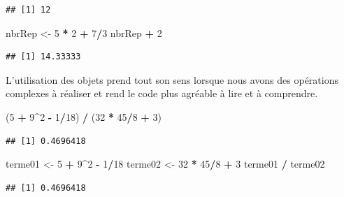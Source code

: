 \documentclass[]{book}
\newenvironment{Shaded}{\begin{snugshade}}{\end{snugshade}}
\newcommand{\DecValTok}[1]{\textcolor[rgb]{0.00,0.00,0.81}{#1}}
\newcommand{\NormalTok}[1]{#1}
\newcommand{\OperatorTok}[1]{\textcolor[rgb]{0.81,0.36,0.00}{\textbf{#1}}}
\newcommand{\StringTok}[1]{\textcolor[rgb]{0.31,0.60,0.02}{#1}}
\begin{document}
\begin{verbatim}
## [1] 12
\end{verbatim}

\begin{Shaded}
\begin{Highlighting}[]
\NormalTok{nbrRep <-}\StringTok{ }\DecValTok{5} \OperatorTok{*}\StringTok{ }\DecValTok{2} \OperatorTok{+}\StringTok{ }\DecValTok{7}\OperatorTok{/}\DecValTok{3}
\NormalTok{nbrRep }\OperatorTok{+}\StringTok{ }\DecValTok{2}
\end{Highlighting}
\end{Shaded}

\begin{verbatim}
## [1] 14.33333
\end{verbatim}

L'utilisation des objets prend tout son sens lorsque nous avons des opérations complexes à réaliser et rend le code plus agréable à lire et à comprendre.

\begin{Shaded}
\begin{Highlighting}[]
\NormalTok{(}\DecValTok{5} \OperatorTok{+}\StringTok{ }\DecValTok{9}\OperatorTok{^}\DecValTok{2} \OperatorTok{-}\StringTok{ }\DecValTok{1}\OperatorTok{/}\DecValTok{18}\NormalTok{) }\OperatorTok{/}\StringTok{ }\NormalTok{(}\DecValTok{32} \OperatorTok{*}\StringTok{ }\DecValTok{45}\OperatorTok{/}\DecValTok{8} \OperatorTok{+}\StringTok{ }\DecValTok{3}\NormalTok{)}
\end{Highlighting}
\end{Shaded}

\begin{verbatim}
## [1] 0.4696418
\end{verbatim}

\begin{Shaded}
\begin{Highlighting}[]
\NormalTok{terme01 <-}\StringTok{ }\DecValTok{5} \OperatorTok{+}\StringTok{ }\DecValTok{9}\OperatorTok{^}\DecValTok{2} \OperatorTok{-}\StringTok{ }\DecValTok{1}\OperatorTok{/}\DecValTok{18}
\NormalTok{terme02 <-}\StringTok{ }\DecValTok{32} \OperatorTok{*}\StringTok{ }\DecValTok{45}\OperatorTok{/}\DecValTok{8} \OperatorTok{+}\StringTok{ }\DecValTok{3}
\NormalTok{terme01 }\OperatorTok{/}\StringTok{ }\NormalTok{terme02}
\end{Highlighting}
\end{Shaded}

\begin{verbatim}
## [1] 0.4696418
\end{verbatim}
\end{document}
